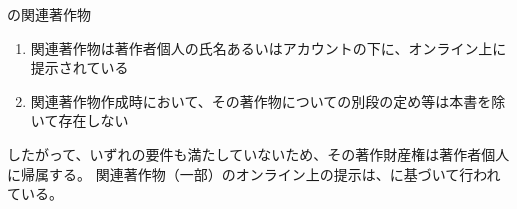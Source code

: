 \begin{\Columnname}{\DMC の関連著作物}
\begin{enumerate}[label=\Roman*]
\begin{enumerate}
  \item[-] モールドの関係データベースの作成
  \item[-] 加工用メインプログラムの自動作成システムの設計
  \item[-] 加工用メインプログラムの自動作成システムの構築および作成
  \item[-] 関連ドキュメントの作成および管理
  \end{enumerate}
\item 関連著作物は著作者個人の氏名あるいはアカウントの下に、オンライン上に提示されている
\item 関連著作物作成時において、その著作物についての別段の定め等は本書を除いて存在しない
\end{enumerate}
\tcbline*
したがって、いずれの要件も満たしていないため、その著作財産権は著作者個人に帰属する。
関連著作物（一部）のオンライン上の提示は、に基づいて行われている。
\end{\Columnname}
\clearrightpage

